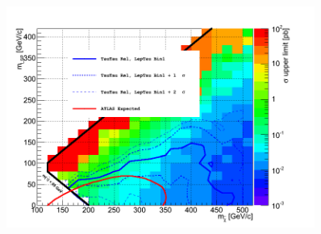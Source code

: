 \begin{linenomath}
\begin{figure}[h]
\centering
\includegraphics[width=0.9\textwidth,keepaspectratio=true]{StatisticsFig/NewFigs/Final_4BinRel.png}
\caption{}
\label{fig:limit_final}
\end{figure}
\end{linenomath}
